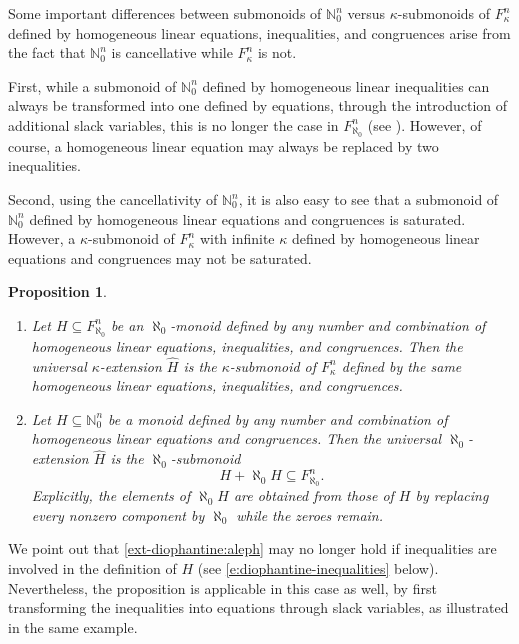 \documentclass[a4paper,11pt,oneside]{amsart}
\newtheorem{prop}[teor]{Proposition}
\theoremstyle{remark}
\newcommand{\bN}{\mathbb N}
\begin{document}
Some important differences between submonoids of $\bN_0^n$ versus $\kappa$-submonoids of $F_\kappa^n$ defined by homogeneous linear equations, inequalities, and congruences arise from the fact that $\bN_0^n$ is cancellative while $F_\kappa^n$ is not.

First, while a submonoid of $\bN_0^n$ defined by homogeneous linear inequalities can always be transformed into one defined by equations, through the introduction of additional slack variables, this is no longer the case in $F_{\aleph_0}^n$ (see \cite[Example 4.3]{infinitepullback}).
However, of course, a homogeneous linear equation may always be replaced by two inequalities.

Second, using the cancellativity of $\bN_0^n$, it is also easy to see that a submonoid of $\bN_0^n$ defined by homogeneous linear equations and congruences is saturated.
However, a $\kappa$-submonoid of $F_\kappa^n$ with infinite $\kappa$ defined by homogeneous linear equations and congruences may not be saturated.

\begin{prop} \label{p:ext-diophantine}
  \begin{enumerate}
    \item \label{ext-diophantine:kappa} Let $H \subseteq F_{\aleph_0}^n$ be an $\aleph_0$-monoid defined by any number and combination of homogeneous linear equations, inequalities, and congruences.
    Then the universal $\kappa$-extension $\widehat H$ is the $\kappa$-submonoid of $F_\kappa^n$ defined by the same homogeneous linear equations, inequalities, and congruences.
    \item \label{ext-diophantine:aleph} Let $H \subseteq \bN_0^n$ be a monoid defined by any number and combination of homogeneous linear equations and congruences.
      Then the universal $\aleph_0$-extension $\widehat H$ is the $\aleph_0$-submonoid
      \[
        H + \aleph_0 H \subseteq F_{\aleph_0}^n.
      \]
      Explicitly, the elements of $\aleph_0 H$ are obtained from those of $H$ by replacing every nonzero component by $\aleph_0$ while the zeroes remain.
  \end{enumerate}
\end{prop}

We point out that \ref{ext-diophantine:aleph} may no longer hold if inequalities are involved in the definition of $H$ (see \cref{e:diophantine-inequalities} below).
Nevertheless, the proposition is applicable in this case as well, by first transforming the inequalities into equations through slack variables, as illustrated in the same example.
\end{document}
